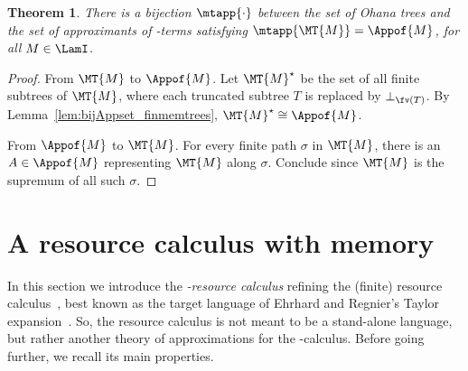 \documentclass[10pt,a4paper]{amsart}
\newtheorem{theorem}{Theorem}
\theoremstyle{definition}
\providecommand{\todo}[2][]{}
\newcommand{\comrci}[1]	{\todo[color=orange,inline]	{Rémy: #1}}
\begin{document}
\setcounter{thm:MTbijApp}{\thetheorem}
\begin{theorem}\label{thm:MTbijApp} 
	There is a bijection $\mtapp{\cdot}$ between the set of Ohana trees and the set of approximants of \lamI-terms satisfying $\mtapp{\MT{M}} = \Appof{M}$, for all $M\in\LamI$.

\end{theorem}

\begin{proof} From $\MT{M}$ to $\Appof{M}$.
Let $\MT{M}^\star$ be the set of all finite subtrees of $\MT{M}$, 
where each truncated subtree $T$ is replaced by $\bot_{\fv(T)}$.
By Lemma~\ref{lem:bijAppset_finmemtrees}, $\MT{M}^\star\cong\Appof{M}$.

From $\Appof{M}$ to $\MT{M}$. For every finite path $\sigma$ in $\MT{M}$, there is an $A\in\Appof{M}$ representing $\MT{M}$ along $\sigma$. Conclude since $\MT{M}$ is the supremum of all such $\sigma$.
\end{proof}




\section{A resource calculus with memory}
\label{sec:resource}


In this section we introduce the \emph{\lamI-resource calculus} refining the (finite) resource calculus~\cite{EhrhardR03}, best known as the target language of Ehrhard and Regnier's Taylor expansion~\cite{Ehrhard.Reg.08}. 
So, the resource calculus is not meant to be a stand-alone language, but rather another theory of approximations for the \lam-calculus.
Before going further, we recall its main properties.

\end{document}
